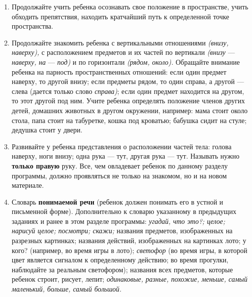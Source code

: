 \documentclass{book}
\renewcommand{\emph}[1]{\textit{#1}}
\begin{document}
\begin{enumerate}
\def\labelenumi{\arabic{enumi}.}
\item
  
  Продолжайте учить ребенка осознавать свое положение в пространстве,
  учить обходить препятствия, находить кратчайший путь к определенной
  точке пространства.
  
\item
  
  Продолжайте знакомить ребенка с вертикальными отношениями
  \emph{(внизу, наверху),} с расположением предметов и их частей по
  вертикали \emph{(внизу} --- \emph{наверху, на} --- \emph{под)} и по
  горизонтали \emph{(рядом, около).} Обращайте внимание ребенка на
  парность пространственных отношений: если один предмет наверху, то
  другой внизу; если предметы рядом, то один справа, а другой --- слева
  (дается только слово \emph{справа)}; если один предмет находится на
  другом, то этот другой под ним. Учите ребенка определять положение
  членов других детей, домашних животных в другом окружении, например:
  мама стоит около стола, папа стоит на табуретке, кошка под кроватью;
  бабушка сидит на стуле; дедушка стоит у двери.
  
\item
  
  Развивайте у ребенка представления о расположении частей тела: голова
  наверху, ноги внизу; одна рука --- тут, другая рука --- тут. Называть
  нужно \textbf{только правую} руку. Все, чем овладевает ребенок по
  данному разделу программы, должно проявляться не только на знакомом,
  но и на новом материале.
  
\item
  
  Словарь \textbf{понимаемой речи} (ребенок должен понимать его в устной
  и письменной форме). Дополнительно к словарю указанному в предыдущих
  заданиях и ранее в этом разделе программы: \emph{угадай, что это?;
  целое; нарисуй целое; посмотри; скажи;} названия предметов,
  изображенных на разрезных картинках; названия действий, изображенных
  на картинках лото; у кого? (например, во время игры в лото);
  \emph{светофор} (во время игры, в которой цвет является сигналом к
  определенному действию; во время прогулки, наблюдайте за реальным
  светофором); названия всех предметов, которые ребенок строит, рисует,
  лепит; \emph{одинаковые, разные, похожие, меньше, самый маленький,
  больше, самый большой.}
  
\end{enumerate}
\end{document}
